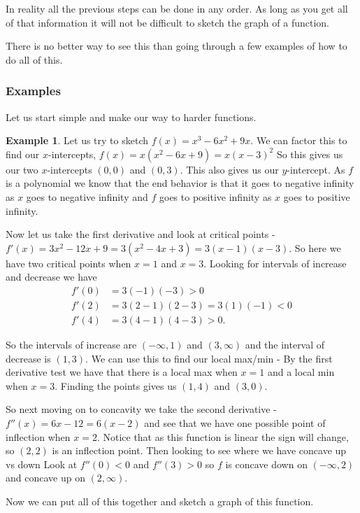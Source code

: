 \documentclass[12pt,reqno]{article}
\theoremstyle{definition}
\newtheorem*{Example}{Example}
\begin{document}
In reality all the previous steps can be done in any order. As long as you get all of that information it will not be difficult to sketch the graph of a function. 

There is no better way to see this than going through a few examples of how to do all of this. 
\subsubsection{Examples}
Let us start simple and make our way to harder functions. 
\begin{Example}
 Let us try to sketch $f(x) = x^3 -6x^2 + 9x$. We can factor this to find our $x$-intercepts, $f(x) = x(x^2 - 6x + 9) = x(x - 3)^2$ So this gives us our two $x$-intercepts $(0, 0)$ and $(0, 3)$. This also gives us our $y$-intercept. As $f$ is a polynomial we know that the end behavior is that it goes to negative infinity as $x$ goes to negative infinity and $f$ goes to positive infinity as $x$ goes to positive infinity. 
 
 Now let us take the first derivative and look at critical points - $f'(x) = 3x^2 - 12x + 9 = 3 (x^2 - 4x + 3) = 3(x - 1)(x - 3)$. So here we have two critical points when $x = 1$ and $x = 3$. Looking for intervals of increase and decrease we have 
 \begin{align*}
 	f'(0) &= 3(- 1)(-3) > 0 \\
	f'(2) &= 3(2 - 1)(2 -3) = 3(1)(-1) < 0 \\
	f'(4) &= 3(4 - 1)(4 - 3) > 0.
\end{align*}

So the intervals of increase are $(-\infty, 1)$ and $(3, \infty)$ and the interval of decrease is $(1, 3)$. We can use this to find our local max/min  - By the first derivative test we have that there is a local max when $x = 1$ and a local min when $x = 3$. Finding the points gives us $(1, 4)$ and $(3, 0)$. 

So next moving on to concavity we take the second derivative - $f''(x) = 6x - 12 = 6(x - 2)$ and see that we have one possible point of inflection when $x = 2$. Notice that as this function is linear the sign will change, so $(2, 2)$ is an inflection point. Then looking to see where we have concave up vs down Look at $f''(0) < 0$ and $f''(3) > 0$ so $f$ is concave down on $(-\infty, 2)$ and concave up on $(2, \infty)$. 

Now we can put all of this together and sketch a graph of this function. 

\end{Example}
\end{document}
